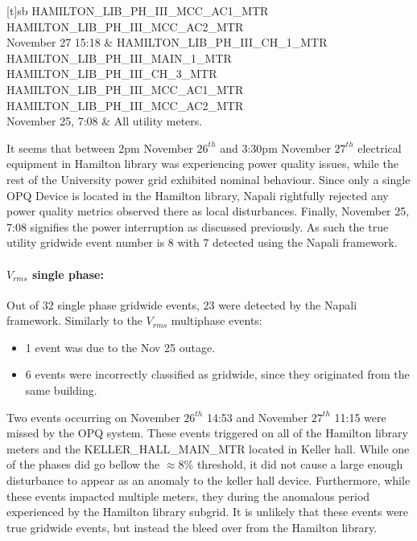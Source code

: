 \begin{center}
\begin{table}[!ht]
\begin{tabularx}{\textwidth}[t]{sb}
            HAMILTON\_LIB\_PH\_III\_MCC\_AC1\_MTR \newline
            HAMILTON\_LIB\_PH\_III\_MCC\_AC2\_MTR \\
            \hline
            November 27 15:18 & 	HAMILTON\_LIB\_PH\_III\_CH\_1\_MTR \newline
            HAMILTON\_LIB\_PH\_III\_MAIN\_1\_MTR \newline
            HAMILTON\_LIB\_PH\_III\_CH\_3\_MTR \newline
            HAMILTON\_LIB\_PH\_III\_MCC\_AC1\_MTR \newline
            HAMILTON\_LIB\_PH\_III\_MCC\_AC2\_MTR \\
            \hline
            November 25, 7:08 & All utility meters. \\
        \end{tabularx}
    \end{table}
\end{center}
It seems that between 2pm November $26^{th}$ and 3:30pm November $27^{th}$ electrical equipment in Hamilton library was experiencing power quality issues, while the rest of the University power grid exhibited nominal behaviour.
Since only a single OPQ Device is located in the Hamilton library, Napali rightfully rejected any power quality metrics observed there as local disturbances.
Finally, November 25, 7:08 signifies the power interruption as discussed previously.
As such the true utility gridwide event number is 8 with 7 detected using the Napali framework.

\paragraph{$V_{rms}$ single phase:}
Out of 32 single phase gridwide events, 23 were detected by the Napali framework.
Similarly to the $V_{rms}$ multiphase events:
\begin{itemize}
    \item 1 event was due to the Nov 25 outage.
    \item 6 events were incorrectly classified as gridwide, since they originated from the same building.
\end{itemize}
Two events occurring on November $26^{th}$ 14:53 and November $27^{th}$ 11:15  were missed by the OPQ system.
These events triggered on all of the Hamilton library meters and the KELLER\_HALL\_MAIN\_MTR located in Keller hall.
While one of the phases did go bellow the $\approx 8\%$ threshold, it did not cause a large enough disturbance to appear as an anomaly to the keller hall device.
Furthermore, while these events impacted multiple meters, they during the anomalous period experienced by the Hamilton library subgrid.
It is unlikely that these events were true gridwide events, but instead the bleed over from the Hamilton library.

